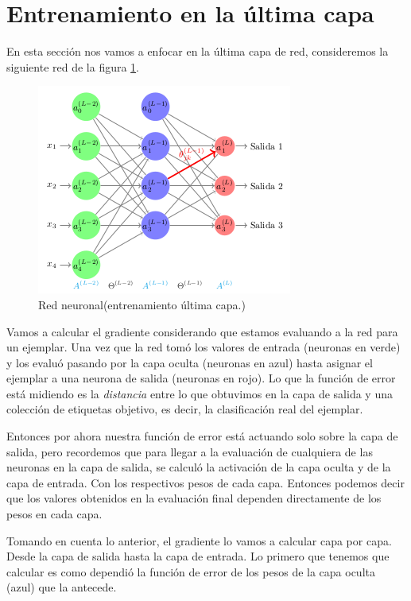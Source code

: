 \section{Entrenamiento en la última capa}

En esta sección nos vamos a enfocar en la última capa de red, consideremos la siguiente red de la figura \ref{fig:REDuc}. 

\begin{figure}[H]
 \centering
 \includegraphics[scale=0.7]{../Figuras/AredNa.png}
 \caption{Red neuronal(entrenamiento última capa.)}
 \label{fig:REDuc}
\end{figure}

Vamos a calcular el gradiente considerando que estamos evaluando a la red para un ejemplar. Una vez que la red tomó los valores de entrada (neuronas en verde) y los evaluó pasando por la capa oculta (neuronas en azul) hasta asignar el ejemplar a una neurona de salida (neuronas en rojo). Lo que la función de error está midiendo es la \textit{distancia} entre lo que obtuvimos en la capa de salida y una colección de etiquetas objetivo, es decir, la clasificación real del ejemplar. 


Entonces por ahora nuestra función de error está actuando solo sobre la capa de salida, pero recordemos que para llegar a la evaluación de cualquiera de las neuronas en la capa de salida, se calculó la activación de la capa oculta y de la capa de entrada. Con los respectivos pesos de cada capa. Entonces podemos decir que los valores obtenidos en la evaluación final dependen directamente de los pesos en cada capa. 


Tomando en cuenta lo anterior, el gradiente lo vamos a calcular capa por capa. Desde la capa de salida hasta la capa de entrada.
Lo primero que tenemos que calcular es como dependió la función de error de los pesos de la capa oculta (azul) que la antecede.


